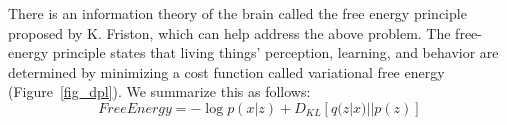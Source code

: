 There is an information theory of the brain called the free energy principle~\cite{Friston2006jpp,Friston2010nrn} proposed by K. Friston, which can help address the above problem. The free-energy principle states that living things' perception, learning, and behavior are determined by minimizing a cost function called variational free energy (Figure~\ref{fig_dpl}). We summarize this as follows:
\begin{equation}
    FreeEnergy = -\log p(x|z) + D_{KL}[q(z|x)||p(z)] \label{eq_free}
\end{equation}
